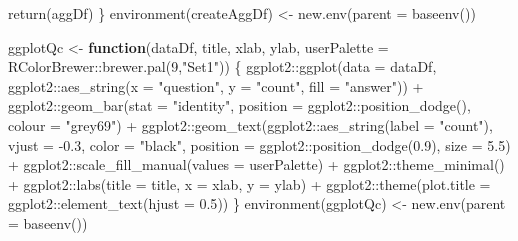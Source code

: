 \documentclass[
]{article}
\newenvironment{Shaded}{\begin{snugshade}}{\end{snugshade}}
\newcommand{\AttributeTok}[1]{\textcolor[rgb]{0.77,0.63,0.00}{#1}}
\newcommand{\ControlFlowTok}[1]{\textcolor[rgb]{0.13,0.29,0.53}{\textbf{#1}}}
\newcommand{\DecValTok}[1]{\textcolor[rgb]{0.00,0.00,0.81}{#1}}
\newcommand{\FloatTok}[1]{\textcolor[rgb]{0.00,0.00,0.81}{#1}}
\newcommand{\FunctionTok}[1]{\textcolor[rgb]{0.00,0.00,0.00}{#1}}
\newcommand{\NormalTok}[1]{#1}
\newcommand{\OtherTok}[1]{\textcolor[rgb]{0.56,0.35,0.01}{#1}}
\newcommand{\SpecialCharTok}[1]{\textcolor[rgb]{0.00,0.00,0.00}{#1}}
\newcommand{\StringTok}[1]{\textcolor[rgb]{0.31,0.60,0.02}{#1}}
\begin{document}
\begin{Shaded}
\begin{Highlighting}[]
  \FunctionTok{return}\NormalTok{(aggDf)}
\NormalTok{\}}
\FunctionTok{environment}\NormalTok{(createAggDf) }\OtherTok{\textless{}{-}} \FunctionTok{new.env}\NormalTok{(}\AttributeTok{parent =} \FunctionTok{baseenv}\NormalTok{())}

\NormalTok{ggplotQc }\OtherTok{\textless{}{-}} \ControlFlowTok{function}\NormalTok{(dataDf, title, xlab, ylab, }\AttributeTok{userPalette =}\NormalTok{ RColorBrewer}\SpecialCharTok{::}\FunctionTok{brewer.pal}\NormalTok{(}\DecValTok{9}\NormalTok{,}\StringTok{"Set1"}\NormalTok{)) \{}
\NormalTok{  ggplot2}\SpecialCharTok{::}\FunctionTok{ggplot}\NormalTok{(}\AttributeTok{data =}\NormalTok{ dataDf, ggplot2}\SpecialCharTok{::}\FunctionTok{aes\_string}\NormalTok{(}\AttributeTok{x =} \StringTok{"question"}\NormalTok{, }\AttributeTok{y =} \StringTok{"count"}\NormalTok{, }\AttributeTok{fill =} \StringTok{"answer"}\NormalTok{)) }\SpecialCharTok{+} 
\NormalTok{    ggplot2}\SpecialCharTok{::}\FunctionTok{geom\_bar}\NormalTok{(}\AttributeTok{stat =} \StringTok{"identity"}\NormalTok{, }\AttributeTok{position =}\NormalTok{ ggplot2}\SpecialCharTok{::}\FunctionTok{position\_dodge}\NormalTok{(), }\AttributeTok{colour =} \StringTok{"grey69"}\NormalTok{) }\SpecialCharTok{+}
\NormalTok{    ggplot2}\SpecialCharTok{::}\FunctionTok{geom\_text}\NormalTok{(ggplot2}\SpecialCharTok{::}\FunctionTok{aes\_string}\NormalTok{(}\AttributeTok{label =} \StringTok{"count"}\NormalTok{), }\AttributeTok{vjust =} \SpecialCharTok{{-}}\FloatTok{0.3}\NormalTok{, }\AttributeTok{color =} \StringTok{"black"}\NormalTok{, }
                       \AttributeTok{position =}\NormalTok{ ggplot2}\SpecialCharTok{::}\FunctionTok{position\_dodge}\NormalTok{(}\FloatTok{0.9}\NormalTok{), }\AttributeTok{size =} \FloatTok{5.5}\NormalTok{) }\SpecialCharTok{+}
\NormalTok{    ggplot2}\SpecialCharTok{::}\FunctionTok{scale\_fill\_manual}\NormalTok{(}\AttributeTok{values =}\NormalTok{ userPalette) }\SpecialCharTok{+}
\NormalTok{    ggplot2}\SpecialCharTok{::}\FunctionTok{theme\_minimal}\NormalTok{() }\SpecialCharTok{+}
\NormalTok{    ggplot2}\SpecialCharTok{::}\FunctionTok{labs}\NormalTok{(}\AttributeTok{title =}\NormalTok{ title, }\AttributeTok{x =}\NormalTok{ xlab, }\AttributeTok{y =}\NormalTok{ ylab) }\SpecialCharTok{+}
\NormalTok{    ggplot2}\SpecialCharTok{::}\FunctionTok{theme}\NormalTok{(}\AttributeTok{plot.title =}\NormalTok{ ggplot2}\SpecialCharTok{::}\FunctionTok{element\_text}\NormalTok{(}\AttributeTok{hjust =} \FloatTok{0.5}\NormalTok{))}
\NormalTok{\}}
\FunctionTok{environment}\NormalTok{(ggplotQc) }\OtherTok{\textless{}{-}} \FunctionTok{new.env}\NormalTok{(}\AttributeTok{parent =} \FunctionTok{baseenv}\NormalTok{())}


\end{Highlighting}
\end{Shaded}
\end{document}
